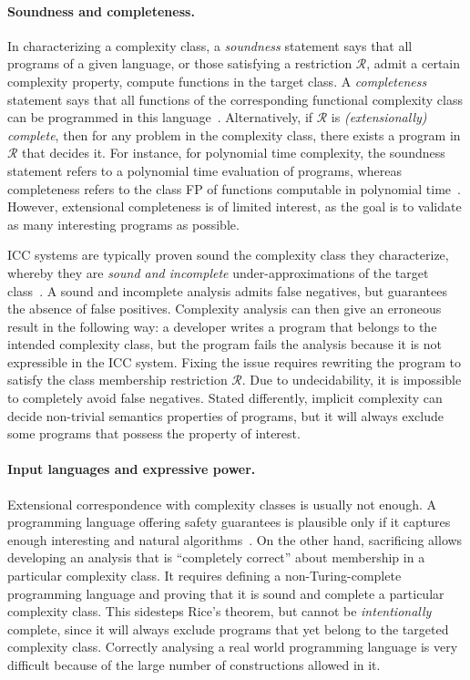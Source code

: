 \paragraph*{Soundness and completeness.}
In characterizing a complexity class,
a \emph{soundness} statement says that all programs of a given language, or those satisfying a restriction \(\mathcal{R}\), admit a certain complexity property, \ie compute functions in the target class.
A \emph{completeness} statement says that all functions of the corresponding functional complexity class can be programmed in this language~\cite{baillot2012}.
Alternatively, if \(\mathcal{R}\) is \emph{(extensionally) complete}, then for any problem in the complexity class, there exists a program in \(\mathcal{R}\) that decides it.
For instance, for polynomial time complexity, the soundness statement refers to a polynomial time evaluation of programs, whereas completeness refers to the class FP of functions computable in polynomial time~\cite{baillot2012}.
However, extensional completeness is of limited interest, as the goal is to validate as many interesting programs as possible.

ICC systems are typically proven sound \wrt the complexity class they characterize, whereby they are \emph{sound and incomplete} under-approximations of the target class~\cite[p. 125]{moyen2017}.
A sound and incomplete analysis admits false negatives, but guarantees the absence of false positives.
Complexity analysis can then give an erroneous result in the following way:
a developer writes a program that belongs to the intended complexity class,
but the program fails the analysis because it is not expressible in the ICC system.
Fixing the issue requires rewriting the program to satisfy the class membership restriction \(\mathcal{R}\).
Due to undecidability, it is impossible to completely avoid false negatives.
Stated differently, implicit complexity can decide non-trivial semantics properties of programs, but it will always exclude some programs that possess the property of interest.

\paragraph*{Input languages and expressive power.}
Extensional correspondence with complexity classes is usually not enough.
A programming language offering safety guarantees is plausible only
if it captures enough interesting and natural algorithms~\cite{baillot2012}.
On the other hand, sacrificing  allows developing an analysis that is \enquote{completely correct} about membership in a particular complexity class.
It requires defining a non-Turing-complete programming language and proving that it is sound and complete \wrt a particular complexity class.
This sidesteps Rice's theorem, but cannot be \emph{intentionally} complete, since it will always exclude programs that yet belong to the targeted complexity class.
Correctly analysing a real world programming language is very difficult because of the large number of constructions allowed in it.

